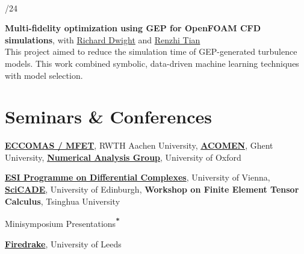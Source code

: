 \documentclass[a4paper,10pt]{article}
\renewcommand{\small}{\fontsize{12.5}{12.5}\selectfont}
\newcommand{\person}[2]{\textcolor{linkcol}{\href{#1}{#2}}}
\newcommand{\subsectitle}[1]{{\color{brick}\fontsize{15}{17}\selectfont #1}\par\vspace{2pt}}
\newlength{\datewidth}
\newlength{\pubwidth}
\newcommand{\pubtitle}[1]{\textbf{\textcolor{pubcol}{#1}}}
\newcommand{\yearentry}[2]{%
  \vspace{2pt}%
  \begin{minipage}[t]{\datewidth}
    \raggedleft #1
  \end{minipage}%
  \hspace{0.4cm}%
  \begin{minipage}[t]{\pubwidth}
    #2
  \end{minipage}%
  \vspace{2pt}%
}
\newcommand{\projtitle}[1]{\textbf{#1}}
\newcommand{\projentry}[4]{%
  \vspace{2pt}%
  \begin{minipage}[t]{\datewidth}
    \raggedleft #1
  \end{minipage}%
  \hspace{0.4cm}%
  \begin{minipage}[t]{\pubwidth}
    \projtitle{#2}, with #3\\[2pt]
    {\small #4}%
  \end{minipage}%
  \vspace{2pt}%
}
\begin{document}
\vspace{5pt}
\projentry{2023\\/24}%
{Multi-fidelity optimization using GEP for OpenFOAM CFD simulations}%
{\person{https://aerodynamics.lr.tudelft.nl/~rdwight/}{Richard Dwight} and \person{https://www.tudelft.nl/en/staff/r.tian.1/}{Renzhi Tian}}%
{This project aimed to reduce the simulation time of GEP-generated turbulence models. This work combined symbolic, data-driven machine learning techniques with model selection.}

\section*{Seminars \& Conferences}

\makeatletter
\renewcommand{\@makefnmark}{\textsuperscript{\textcolor{brick}{\large\textbf{*}}}}
\renewcommand{\@makefntext}[1]{\textcolor{brick}{\large\textbf{*}}\ #1}
\makeatother

\yearentry{2025\footnotemark[\value{footnote}]}{%
  \href{https://mfet2025.de/}{\pubtitle{ECCOMAS / MFET}}, RWTH Aachen University,
  \href{https://cage.ugent.be/acomen2025/}{\pubtitle{ACOMEN}}, Ghent University,
  \href{https://www.maths.ox.ac.uk/node/74237}{\pubtitle{Numerical Analysis Group}}, University of Oxford%
}

\vspace{2pt}
\yearentry{2026\footnotemark[\value{footnote}]}{%
  \href{https://www.esi.ac.at/events/t3204/}{\pubtitle{ESI Programme on Differential Complexes}}, University of Vienna,
  \href{https://scicade.org/}{\pubtitle{SciCADE}}, University of Edinburgh,
  \pubtitle{Workshop on Finite Element Tensor Calculus}, Tsinghua University%
}

\vspace{4pt}
\subsectitle{Minisymposium Presentations\textsuperscript{\textcolor{golden}{\large\textbf{*}}}}

\bgroup
\makeatletter
\renewcommand{\@makefntext}[1]{\textcolor{golden}{\large\textbf{*}}\ #1}
\makeatother
{}
\egroup

\yearentry{2025}{%
  \href{https://www.firedrakeproject.org/firedrake_25.html}{\pubtitle{Firedrake}}, University of Leeds%
}
\end{document}

